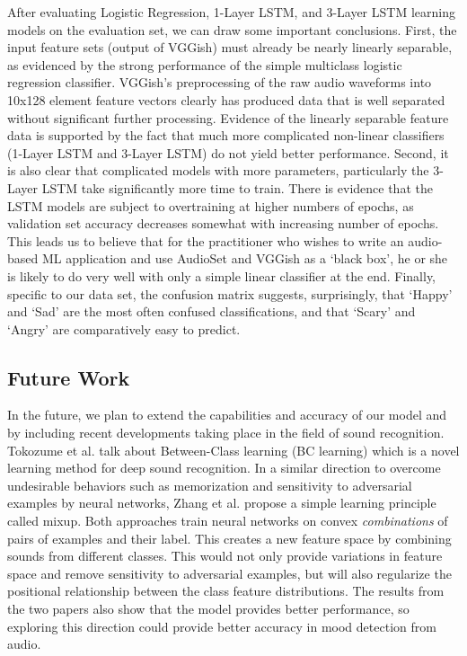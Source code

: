 \documentclass{article}
\begin{document}
After evaluating Logistic Regression, 1-Layer LSTM, and 3-Layer LSTM learning models on the evaluation set, we can draw some important conclusions. First, the input feature sets (output of VGGish) must already be nearly linearly separable, as evidenced by the strong performance of the simple multiclass logistic regression classifier. VGGish’s preprocessing of the raw audio waveforms into 10x128 element feature vectors clearly has produced data that is well separated without significant further processing. Evidence of the linearly separable feature data is supported by the fact that much more complicated non-linear classifiers (1-Layer LSTM and 3-Layer LSTM) do not yield better performance. Second, it is also clear that complicated models with more parameters, particularly the 3-Layer LSTM take significantly more time to train. There is evidence that the LSTM models are subject to overtraining at higher numbers of epochs, as validation set accuracy decreases somewhat with increasing number of epochs. This leads us to believe that for the practitioner who wishes to write an audio-based ML application and use AudioSet and VGGish as a `black box', he or she is likely to do very well with only a simple linear classifier at the end. Finally, specific to our data set, the confusion matrix suggests, surprisingly, that ‘Happy’ and ‘Sad’ are the most often confused classifications, and that ‘Scary’ and ‘Angry’ are comparatively easy to predict. 

\subsection{Future Work}

In the future, we plan to extend the capabilities and accuracy of our model and by including recent developments taking place in the field of sound recognition. Tokozume et al. \cite{tokozume} talk about Between-Class learning (BC learning) which is a novel learning method for deep sound recognition. In a similar direction to overcome undesirable behaviors such as memorization and sensitivity to adversarial examples by neural networks, Zhang et al. \cite{zhang} propose a simple learning principle called mixup. Both approaches train neural networks on convex \textit{combinations} of pairs of examples and their label. This creates a new feature space by combining sounds from different classes. This would not only provide variations in feature space and remove sensitivity to adversarial examples, but will also regularize the positional relationship between the class feature distributions. The results from the two papers also show that the model provides better performance, so exploring this direction could provide better accuracy in mood detection from audio. 
\end{document}
